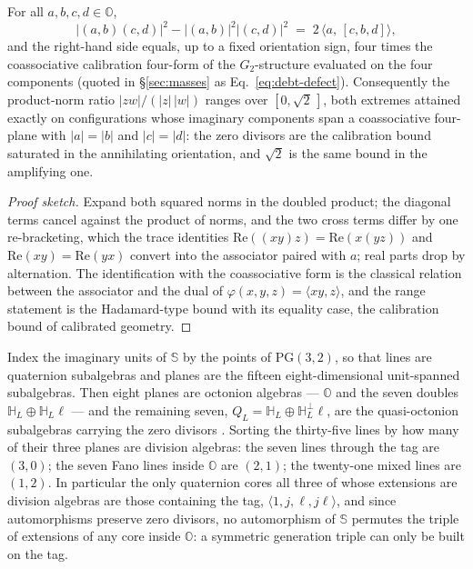 \begin{proposition}\label{prop:zd-defect}
For all $a, b, c, d \in \mathbb{O}$,
\begin{equation}
  \bigl\lvert (a,b)(c,d) \bigr\rvert^{2}
  - \bigl\lvert (a,b) \bigr\rvert^{2} \bigl\lvert (c,d) \bigr\rvert^{2}
  \;=\; 2\,\bigl\langle a,\, [c,b,d] \bigr\rangle ,
  \label{eq:zd-defect}
\end{equation}
and the right-hand side equals, up to a fixed orientation sign, four times the coassociative
calibration four-form of the $G_2$-structure evaluated on the four components (quoted in \S\ref{sec:masses} as Eq.~\eqref{eq:debt-defect}). Consequently the
product-norm ratio $\lvert zw \rvert / (\lvert z\rvert\,\lvert w\rvert)$ ranges over
$[0, \sqrt{2}\,]$, both extremes attained exactly on configurations whose imaginary components span
a coassociative four-plane with $\lvert a\rvert = \lvert b\rvert$ and
$\lvert c\rvert = \lvert d\rvert$: the zero divisors are the calibration bound saturated in the
annihilating orientation, and $\sqrt2$ is the same bound in the amplifying one.
\end{proposition}

\begin{proof}[Proof sketch]
Expand both squared norms in the doubled product; the diagonal terms cancel against the product of
norms, and the two cross terms differ by one re-bracketing, which the trace identities
$\mathrm{Re}((xy)z) = \mathrm{Re}(x(yz))$ and $\mathrm{Re}(xy) = \mathrm{Re}(yx)$ convert into the
associator paired with $a$; real parts drop by alternation. The identification with the
coassociative form is the classical relation between the associator and the dual of
$\varphi(x,y,z) = \langle xy, z\rangle$, and the range statement is the Hadamard-type bound with
its equality case, the calibration bound of calibrated geometry.
\end{proof}

\begin{proposition}\label{prop:zd-census}
Index the imaginary units of $\mathbb{S}$ by the points of $\mathrm{PG}(3,2)$, so that lines are
quaternion subalgebras and planes are the fifteen eight-dimensional unit-spanned subalgebras. Then
eight planes are octonion algebras --- $\mathbb{O}$ and the seven doubles
$\mathbb{H}_L \oplus \mathbb{H}_L\ell$ --- and the remaining seven,
$Q_L = \mathbb{H}_L \oplus \mathbb{H}_L^{\perp}\ell$, are the quasi-octonion subalgebras carrying
the zero divisors \autocite{cawagas2004sedenion,demarrais2000assessors}. Sorting the thirty-five
lines by how many of their three planes are division algebras: the seven lines through the tag are
$(3,0)$; the seven Fano lines inside $\mathbb{O}$ are $(2,1)$; the twenty-one mixed lines are
$(1,2)$. In particular the only quaternion cores all three of whose extensions are division
algebras are those containing the tag, $\langle 1, j, \ell, j\ell\rangle$, and since automorphisms
preserve zero divisors, no automorphism of $\mathbb{S}$ permutes the triple of extensions of any
core inside $\mathbb{O}$: a symmetric generation triple can only be built on the tag.
\end{proposition}

